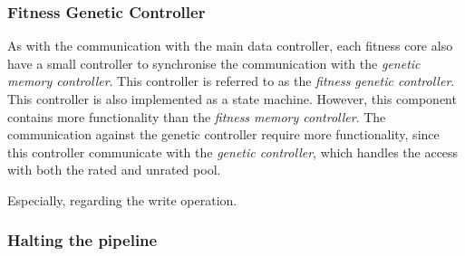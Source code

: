 \subsubsection{Fitness Genetic Controller} 
As with the communication with the main data controller, each fitness core also have a small controller to synchronise the communication with the \emph{genetic memory controller}. This controller is referred to as the \emph{fitness genetic controller}. This controller is also implemented as a state machine. However, this component contains more functionality than the \emph{fitness memory controller}. The communication against the genetic controller require more functionality, since this controller communicate with the \emph{genetic controller}, which handles the access with both the rated and unrated pool. 














Especially, regarding the write operation.  








\subsubsection{Halting the pipeline}





